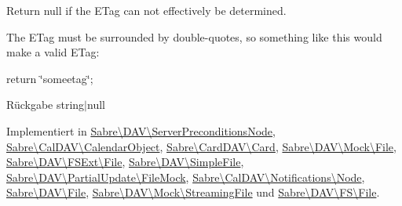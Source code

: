 Return null if the E\+Tag can not effectively be determined.

The E\+Tag must be surrounded by double-\/quotes, so something like this would make a valid E\+Tag\+:

return \textquotesingle{}\char`\"{}someetag\char`\"{}\textquotesingle{};

\begin{DoxyReturn}{Rückgabe}
string$\vert$null 
\end{DoxyReturn}


Implementiert in \mbox{\hyperlink{class_sabre_1_1_d_a_v_1_1_server_preconditions_node_a87cade6d2776963f690d121cbed1360d}{Sabre\textbackslash{}\+D\+A\+V\textbackslash{}\+Server\+Preconditions\+Node}}, \mbox{\hyperlink{class_sabre_1_1_cal_d_a_v_1_1_calendar_object_a8cbcfda4ad2f5d8ef67a7fb11ca4ea07}{Sabre\textbackslash{}\+Cal\+D\+A\+V\textbackslash{}\+Calendar\+Object}}, \mbox{\hyperlink{class_sabre_1_1_card_d_a_v_1_1_card_a056407dada85e2786c53b6a26ead94e7}{Sabre\textbackslash{}\+Card\+D\+A\+V\textbackslash{}\+Card}}, \mbox{\hyperlink{class_sabre_1_1_d_a_v_1_1_mock_1_1_file_a9654d2fd0b81900d1c75bf3d7129d0be}{Sabre\textbackslash{}\+D\+A\+V\textbackslash{}\+Mock\textbackslash{}\+File}}, \mbox{\hyperlink{class_sabre_1_1_d_a_v_1_1_f_s_ext_1_1_file_a9230f17550bcc13aac15429e356280e1}{Sabre\textbackslash{}\+D\+A\+V\textbackslash{}\+F\+S\+Ext\textbackslash{}\+File}}, \mbox{\hyperlink{class_sabre_1_1_d_a_v_1_1_simple_file_ac6706a1b6c9d029f253c6df2b6616f11}{Sabre\textbackslash{}\+D\+A\+V\textbackslash{}\+Simple\+File}}, \mbox{\hyperlink{class_sabre_1_1_d_a_v_1_1_partial_update_1_1_file_mock_ac3cb7c33686234052db8f3b870822cc9}{Sabre\textbackslash{}\+D\+A\+V\textbackslash{}\+Partial\+Update\textbackslash{}\+File\+Mock}}, \mbox{\hyperlink{class_sabre_1_1_cal_d_a_v_1_1_notifications_1_1_node_adc6fffcad09368941ba2f17fd4273846}{Sabre\textbackslash{}\+Cal\+D\+A\+V\textbackslash{}\+Notifications\textbackslash{}\+Node}}, \mbox{\hyperlink{class_sabre_1_1_d_a_v_1_1_file_a2f7e2ec46cb8def9cda8dea55faf7d9e}{Sabre\textbackslash{}\+D\+A\+V\textbackslash{}\+File}}, \mbox{\hyperlink{class_sabre_1_1_d_a_v_1_1_mock_1_1_streaming_file_a53ac81dd1c660afac1dd3c39c00e4d47}{Sabre\textbackslash{}\+D\+A\+V\textbackslash{}\+Mock\textbackslash{}\+Streaming\+File}} und \mbox{\hyperlink{class_sabre_1_1_d_a_v_1_1_f_s_1_1_file_a133fec88700f329ed4aa9a7e6c1fd5cd}{Sabre\textbackslash{}\+D\+A\+V\textbackslash{}\+F\+S\textbackslash{}\+File}}.

\mbox{\label{interface_sabre_1_1_d_a_v_1_1_i_file_aa1534e00805f45d9282de9c699dbe178}} 
